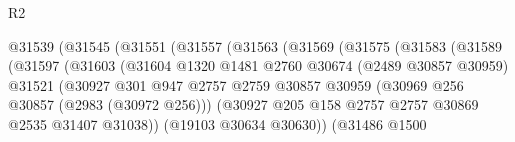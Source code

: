 \begin{lexlean}{R2}
\begin{coremodule}
                                  @31539
                                    (@31545
                                      (@31551
                                        (@31557
                                          (@31563
                                            (@31569
                                              (@31575
                                                (@31583
                                                  (@31589
                                                    (@31597
                                                      (@31603
                                                        (@31604
                                                          @1320
                                                          @1481
                                                          @2760
                                                          @30674
                                                          (@2489 @30857 @30959)
                                                          @31521
                                                          (@30927
                                                            @301
                                                            @947
                                                            @2757
                                                            @2759
                                                            @30857
                                                            @30959
                                                            (@30969
                                                              @256
                                                              @30857
                                                              (@2983 (@30972 @256)))
                                                            (@30927
                                                              @205
                                                              @158
                                                              @2757
                                                              @2757
                                                              @30869
                                                              @2535
                                                              @31407
                                                              @31038))
                                                          (@19103 @30634 @30630))
                                                        (@31486
                                                          @1500

\end{coremodule}
\end{lexlean}
